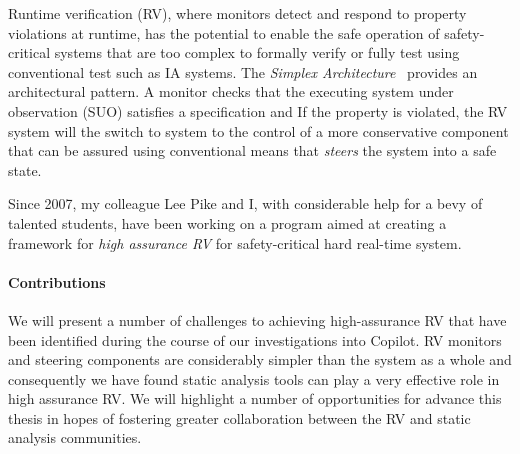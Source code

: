 Runtime verification (RV), where monitors detect and respond to
property violations at runtime, has the potential to enable the safe
operation of safety-critical systems that are too complex to formally
verify or fully test using conventional test such as IA systems. The
\emph{Simplex Architecture}~\cite{simplex} provides an architectural
pattern. A monitor checks that the executing system under observation
(SUO) satisfies a specification and If the property is violated, the
RV system will the switch to system to the control of a more
conservative component that can be assured using conventional means
that \emph{steers} the system into a safe state. 


 
Since 2007, my colleague Lee Pike and I, with considerable help for a
bevy of talented students, have been working on a program aimed at
creating a framework for \emph{high assurance RV} for safety-critical
hard real-time system.  




\paragraph{Contributions} 

We will present a number of challenges to achieving high-assurance RV
that  have been identified during
the course of our investigations into Copilot.  RV
monitors and steering components are considerably simpler than
the system as a whole and consequently we have found static analysis
tools can play a  very effective role in high assurance RV.  We will
highlight a number of opportunities for advance this thesis in hopes
of fostering greater collaboration between the RV and static analysis
communities. 



